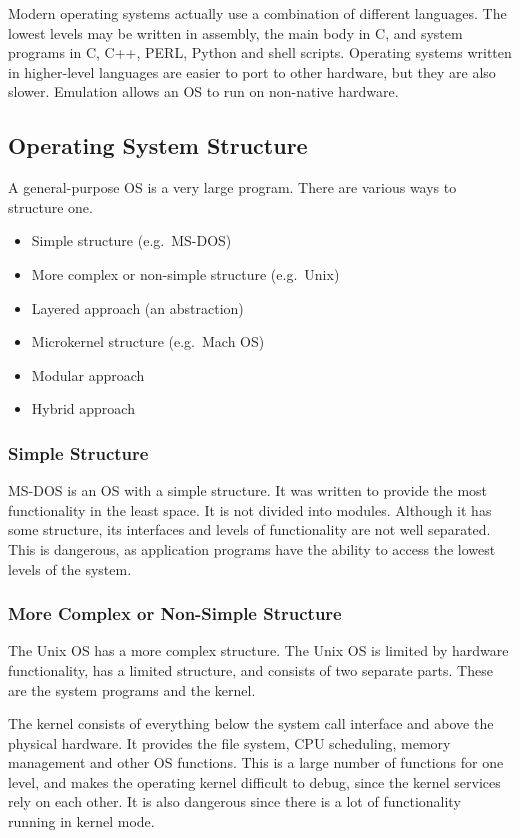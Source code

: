 Modern operating systems actually use a combination of different languages.
The lowest levels may be written in assembly, the main body in C, and system programs in C, C++, PERL, Python and shell scripts.
Operating systems written in higher-level languages are easier to port to other hardware, but they are also slower.
Emulation allows an OS to run on non-native hardware.

\subsection{Operating System Structure}

A general-purpose OS is a very large program.
There are various ways to structure one.
\begin{itemize}
  \item Simple structure (e.g.\ MS-DOS)
  \item More complex or non-simple structure (e.g.\ Unix)
  \item Layered approach (an abstraction)
  \item Microkernel structure (e.g.\ Mach OS)
  \item Modular approach
  \item Hybrid approach
\end{itemize}

\subsubsection{Simple Structure}

MS-DOS is an OS with a simple structure.
It was written to provide the most functionality in the least space.
It is not divided into modules.
Although it has some structure, its interfaces and levels of functionality are not well separated.
This is dangerous, as application programs have the ability to access the lowest levels of the system.

\subsubsection{More Complex or Non-Simple Structure}

The Unix OS has a more complex structure.
The Unix OS is limited by hardware functionality, has a limited structure, and consists of two separate parts.
These are the system programs and the kernel.

The kernel consists of everything below the system call interface and above the physical hardware.
It provides the file system, CPU scheduling, memory management and other OS functions.
This is a large number of functions for one level, and makes the operating kernel difficult to debug, since the kernel services rely on each other.
It is also dangerous since there is a lot of functionality running in kernel mode.

